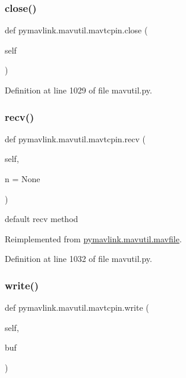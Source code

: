 \subsubsection{\texorpdfstring{close()}{close()}}
{\footnotesize\ttfamily def pymavlink.\+mavutil.\+mavtcpin.\+close (\begin{DoxyParamCaption}\item[{}]{self }\end{DoxyParamCaption})}



Definition at line 1029 of file mavutil.\+py.

\mbox{\label{classpymavlink_1_1mavutil_1_1mavtcpin_a51df915724f2169ba96fd97fc0897151}} 
\subsubsection{\texorpdfstring{recv()}{recv()}}
{\footnotesize\ttfamily def pymavlink.\+mavutil.\+mavtcpin.\+recv (\begin{DoxyParamCaption}\item[{}]{self,  }\item[{}]{n = {\ttfamily None} }\end{DoxyParamCaption})}

\begin{DoxyVerb}default recv method\end{DoxyVerb}
 

Reimplemented from \mbox{\hyperlink{classpymavlink_1_1mavutil_1_1mavfile_a09cb800fc6b03949ace05ce320539be2}{pymavlink.\+mavutil.\+mavfile}}.



Definition at line 1032 of file mavutil.\+py.

\mbox{\label{classpymavlink_1_1mavutil_1_1mavtcpin_afa11c00945123d40e77e47015066670d}} 
\subsubsection{\texorpdfstring{write()}{write()}}
{\footnotesize\ttfamily def pymavlink.\+mavutil.\+mavtcpin.\+write (\begin{DoxyParamCaption}\item[{}]{self,  }\item[{}]{buf }\end{DoxyParamCaption})}

